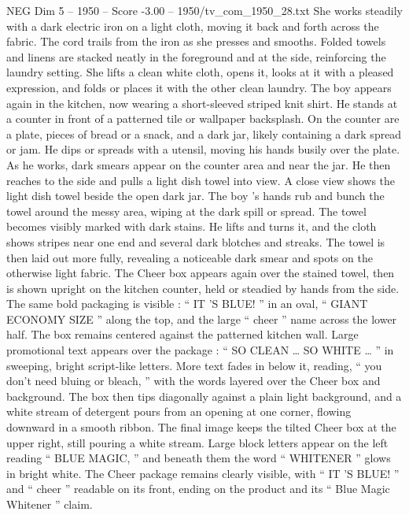 \begin{textsample}{NEG Dim 5 – 1950 – Score -3.00 – 1950/tv\_com\_1950\_28.txt}
She works steadily with a dark electric iron on a light cloth, moving it back and forth across the fabric.
The cord trails from the iron as she presses and smooths.
Folded towels and linens are stacked neatly in the foreground and at the side, reinforcing the laundry setting.
She lifts a clean white cloth, opens it, looks at it with a pleased expression, and folds or places it with the other clean laundry.
The boy appears again in the kitchen, now wearing a short-sleeved striped knit shirt.
He stands at a counter in front of a patterned tile or wallpaper backsplash.
On the counter are a plate, pieces of bread or a snack, and a dark jar, likely containing a dark spread or jam.
He dips or spreads with a utensil, moving his hands busily over the plate.
As he works, dark smears appear on the counter area and near the jar.
He then reaches to the side and pulls a light dish towel into view.
A close view shows the light dish towel beside the open dark jar.
The boy ’s hands rub and bunch the towel around the messy area, wiping at the dark spill or spread.
The towel becomes visibly marked with dark stains.
He lifts and turns it, and the cloth shows stripes near one end and several dark blotches and streaks.
The towel is then laid out more fully, revealing a noticeable dark smear and spots on the otherwise light fabric.
The Cheer box appears again over the stained towel, then is shown upright on the kitchen counter, held or steadied by hands from the side.
The same bold packaging is visible : “ IT ’S BLUE! ” in an oval, “ GIANT ECONOMY SIZE ” along the top, and the large “ cheer ” name across the lower half.
The box remains centered against the patterned kitchen wall.
Large promotional text appears over the package : “ SO CLEAN … SO WHITE … ” in sweeping, bright script-like letters.
More text fades in below it, reading, “ you don't need bluing or bleach, ” with the words layered over the Cheer box and background.
The box then tips diagonally against a plain light background, and a white stream of detergent pours from an opening at one corner, flowing downward in a smooth ribbon.
The final image keeps the tilted Cheer box at the upper right, still pouring a white stream.
Large block letters appear on the left reading “ BLUE MAGIC, ” and beneath them the word “ WHITENER ” glows in bright white.
The Cheer package remains clearly visible, with “ IT ’S BLUE! ” and “ cheer ” readable on its front, ending on the product and its “ Blue Magic Whitener ” claim.

\end{textsample}
